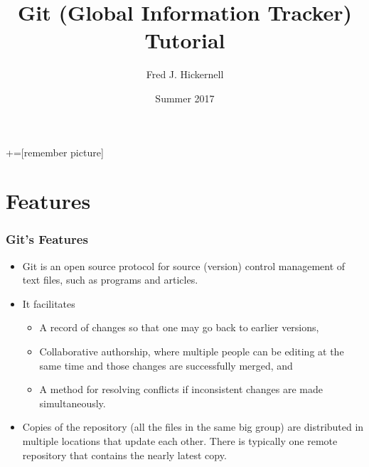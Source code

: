 \documentclass[12pt, compress,xcolor={usenames,dvipsnames}]{beamer} %
\begin{document}
	+=[remember picture]
	\everymath{\displaystyle}
	
	\title[Git Tutorial]{Git (Global Information Tracker) Tutorial}
	\author[Fred J. Hickernell]{Fred J. Hickernell}
	\date{Summer 2017}
	\frame[label=title]{\titlepage}
	
	
\section{Features}
	\begin{frame}\frametitle{Git's Features}
		
		\vspace{-3ex}
		
		\begin{itemize}
						
			\item Git is an open source protocol for \alert{source (version) control management} of text files, such as programs and articles.
			
			\item It facilitates
			
			\begin{itemize}
				\item A \alert{record of changes} so that one may go back to earlier versions,
				
				\item \alert{Collaborative} authorship, where multiple people can be editing at the same time and those changes are successfully merged, and
				
				\item A method for \alert{resolving conflicts} if inconsistent changes are made simultaneously.
			\end{itemize}
			
			\item Copies of the repository (all the files in the same big group) are \alert{distributed} in multiple locations that update each other.  There is typically one remote repository that contains the nearly latest copy.
			 
			
		\end{itemize}
		
	\end{frame}
	
\end{document}
